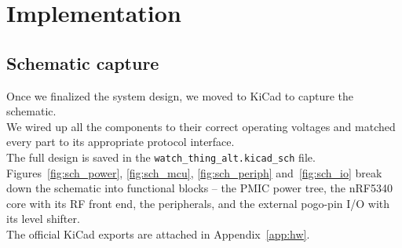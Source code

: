 \documentclass[12pt, a4paper]{article}
\begin{document}
\newpage
\section{Implementation}
\label{sec:impl}

\subsection{Schematic capture}
Once we finalized the system design, we moved to KiCad to capture the schematic. \\
We wired up all the components to their correct operating voltages and matched every part to its appropriate protocol interface. \\
The full design is saved in the \texttt{watch\_thing\_alt.kicad\_sch} file. \\
Figures~\ref{fig:sch_power}, \ref{fig:sch_mcu}, \ref{fig:sch_periph} and~\ref{fig:sch_io} break down the schematic into functional blocks -- the PMIC power tree, the nRF5340 core with its RF front end, the peripherals, and the external pogo-pin I/O with its level shifter. \\
The official KiCad exports are attached in Appendix~\ref{app:hw}.
\end{document}
